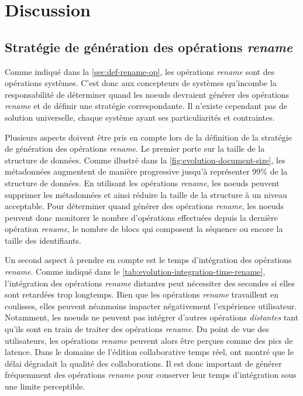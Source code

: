 \documentclass[12pt]{thesul}
\begin{document}
\section{Discussion}

\subsection{Stratégie de génération des opérations \emph{rename}}

Comme indiqué dans la \autoref{sec:def-rename-op}, les opérations \emph{rename} sont des opérations systèmes.
C'est donc aux concepteurs de systèmes qu'incombe la responsabilité de déterminer quand les noeuds devraient générer des opérations \emph{rename} et de définir une stratégie correspondante.
Il n'existe cependant pas de solution universelle, chaque système ayant ses particuliarités et contraintes.

Plusieurs aspects doivent être pris en compte lors de la définition de la stratégie de génération des opérations \emph{rename}.
Le premier porte sur la taille de la structure de données.
Comme illustré dans la \autoref{fig:evolution-document-size}, les métadonnées augmentent de manière progressive jusqu'à représenter 99\% de la structure de données.
En utilisant les opérations \emph{rename}, les noeuds peuvent supprimer les métadonnées et ainsi réduire la taille de la structure à un niveau acceptable.
Pour déterminer quand générer des opérations \emph{rename}, les noeuds peuvent donc monitorer le nombre d'opérations effectuées depuis la dernière opération \emph{rename}, le nombre de blocs qui composent la séquence ou encore la taille des identifiants.

Un second aspect à prendre en compte est le temps d'intégration des opérations \emph{rename}.
Comme indiqué dans le \autoref{tab:evolution-integration-time-rename}, l'intégration des opérations \emph{rename} distantes peut nécessiter des secondes si elles sont retardées trop longtemps.
Bien que les opérations \emph{rename} travaillent en coulisses, elles peuvent néanmoins impacter négativement l'expérience utilisateur.
Notamment, les noeuds ne peuvent pas intégrer d'autres opérations \emph{distantes} tant qu'ils sont en train de traiter des opérations \emph{rename}.
Du point de vue des utilisateurs, les opérations \emph{rename} peuvent alors être perçues comme des pics de latence.
Dans le domaine de l'édition collaborative temps réel, \textcite{ignat:hal-01088815,ignat:hal-01238831} ont montré que le délai dégradait la qualité des collaborations.
Il est donc important de générer fréquemment des opérations \emph{rename} pour conserver leur temps d'intégration sous une limite perceptible.
\end{document}
